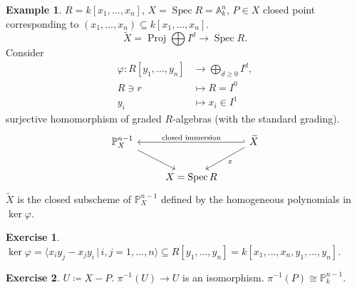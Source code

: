 \documentclass[12pt]{article}
\DeclareMathOperator{\Spec}{Spec}
\DeclareMathOperator{\Proj}{Proj}
\theoremstyle{definition}
\newtheorem*{exercise}{Exercise}
\newtheorem*{example}{Example}
\begin{document}
\begin{example}
$R=k[x_1,\ldots,x_n]$, $X=\Spec R=\mathbb A_k^n$, $P\in X$ closed point corresponding to $(x_1,\ldots,x_n)\subseteq k[x_1,\ldots,x_n]$.
\[\widetilde X=\Proj\bigoplus I^d\longrightarrow\Spec R.\]
Consider
\begin{align*}
\varphi:R[y_1,\ldots,y_n]&\longrightarrow\bigoplus_{d\geq0}I^d,\\R\ni r&\longmapsto R=I^0\\y_i&\longmapsto x_i\in I^1
\end{align*}
surjective homomorphism of graded $R$-algebras (with the standard grading).
\[\begin{tikzcd}\mathbb P_X^{n-1}\arrow[rd]&&\widetilde X\arrow[ll,hook',"\text{closed immersion}",swap]\arrow[ld,"\pi"]\\&X=\Spec R\end{tikzcd}\]
$\widetilde X$ is the closed subscheme of $\mathbb P_X^{n-1}$ defined by the homogeneous polynomials in $\ker\varphi$.

\begin{exercise}
$\ker\varphi=\langle x_iy_j-x_jy_i\,|\,i,j=1,\ldots,n\rangle\subseteq R[y_1,\ldots,y_n]=k[x_1,\ldots,x_n,y_1,\ldots,y_n]$.
\end{exercise}

\begin{exercise}
$U\coloneqq X-P$. $\pi^{-1}(U)\rightarrow U$ is an isomorphism. $\pi^{-1}(P)\cong\mathbb P_k^{n-1}$.
\end{exercise}
\end{example}
\end{document}
